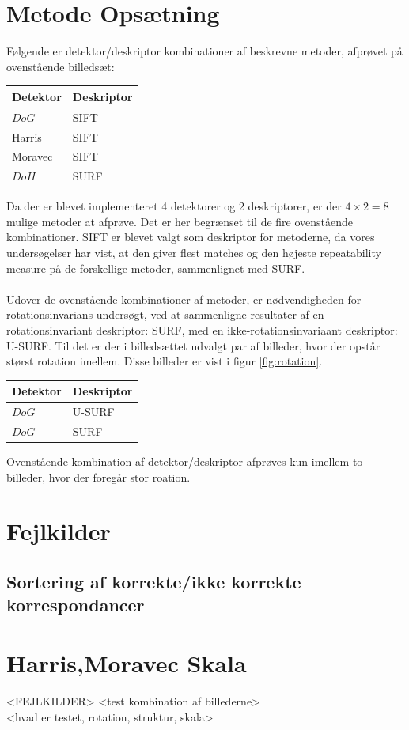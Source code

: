 \section{Metode Opsætning}
Følgende er detektor/deskriptor kombinationer af beskrevne metoder, afprøvet på ovenstående billedsæt:
\begin{center}
    \begin{tabular}{ | l | l |}
    \hline
    Detektor & Deskriptor \\ \hline
    $DoG$ & SIFT  \\ \hline       
    Harris & SIFT \\ \hline    
    Moravec & SIFT \\ \hline    
    $DoH$ & SURF\\ \hline    
    \end{tabular}
\end{center}
Da der er blevet implementeret 4 detektorer og 2 deskriptorer, er der $4\times 2=8$ mulige metoder at afprøve. Det er her begrænset til de fire ovenstående kombinationer. SIFT er blevet valgt som deskriptor for metoderne, da vores undersøgelser har vist, at den giver flest matches og den højeste repeatability measure på de forskellige metoder, sammenlignet med SURF. 
\\ \\ 
Udover de ovenstående kombinationer af metoder, er nødvendigheden for rotationsinvarians undersøgt, ved at sammenligne resultater af en rotationsinvariant deskriptor: SURF, med en ikke-rotationsinvariaant deskriptor: U-SURF. Til det er der i billedsættet udvalgt par af billeder, hvor der opstår størst rotation imellem. Disse billeder er vist i figur \ref{fig:rotation}.
\begin{center}
    \begin{tabular}{ | l | l |}
    \hline
    Detektor & Deskriptor \\ \hline
    $DoG$ & U-SURF \\ \hline       
    $DoG$ & SURF \\ \hline     
    \end{tabular}
\end{center}
Ovenstående kombination af detektor/deskriptor afprøves kun imellem to billeder, hvor der foregår stor roation.
\section{Fejlkilder}
\subsection{Sortering af korrekte/ikke korrekte korrespondancer}
\section{Harris,Moravec Skala}
<FEJLKILDER>
<test kombination af billederne> \\
<hvad er testet, rotation, struktur, skala>
